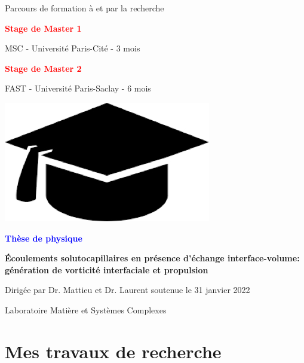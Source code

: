\documentclass[aspectratio=169,10pt]{beamer}
\begin{document}
\begin{frame}{Parcours de formation à et par la recherche}
\begin{minipage}{.3\linewidth}
\textbf{\textcolor{red}{Stage de Master 1}}\smallskip

MSC - Université Paris-Cité - 3 mois\smallskip

\textbf{\textcolor{red}{Stage de Master 2}}\smallskip

FAST - Université Paris-Saclay - 6 mois 

\vfill
\end{minipage}\hfill
\begin{minipage}{.32\linewidth}
  \centering
\includegraphics[width=.25\linewidth]{./figures/these.jpg}\smallskip


\textbf{\textcolor{blue}{Thèse de physique}}\smallskip

\textbf{\og{}Écoulements solutocapillaires en présence d'échange interface-volume: génération de vorticité interfaciale et propulsion\fg{}}\smallskip

Dirigée par Dr. Mattieu  et Dr. Laurent 
 soutenue le 31 janvier 2022\smallskip

Laboratoire Matière et Systèmes Complexes
\end{minipage}
\end{frame}

\section{Mes travaux de recherche}
\end{document}
